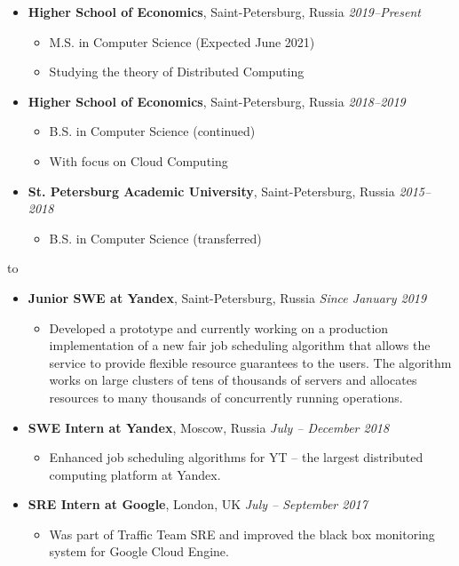 \documentclass[10pt,a4paper]{extarticle}
\def\tbf{\textbf}
\def\lrg#1{\large\textbf{#1}\normalsize}
\def\headline#1{\medskip\hbox to \hsize{\hrulefill\quad\lower.3em\hbox{\lrg{#1}}\quad\hrulefill}\medskip}
\def\reslist{\vspace{-8pt}\begin{itemize}[label={},leftmargin=*]}
\def\endreslist{\end{itemize}\vspace{-5pt}}
\def\resRaw#1{
  \item #1\normalsize
  \vspace{-5pt}
}
\def\resLocTime#1#2#3{
  \resRaw {
    \tbf{#1}, #2 \hspace*{\fill} \textit{#3}
  }
}
\def\beginres{\begin{itemize}[label=\textbullet]}
\def\endres{\end{itemize}\vspace{-6pt}}
\def\subitem{\item}
\begin{document}
\reslist
  \resLocTime{Higher School of Economics} {Saint-Petersburg, Russia} {2019--Present}
  \beginres
    \subitem M.S. in Computer Science (Expected June 2021)
    \subitem Studying the theory of Distributed Computing
  \endres
  \resLocTime{Higher School of Economics} {Saint-Petersburg, Russia} {2018--2019}
  \beginres
    \subitem B.S. in Computer Science (continued)
    \subitem With focus on Cloud Computing
  \endres
  \resLocTime{St. Petersburg Academic University} {Saint-Petersburg, Russia} {2015--2018}
  \beginres
    \subitem B.S. in Computer Science (transferred)
  \endres
\endreslist

\headline{Work Experience}

\reslist
  \resLocTime{Junior SWE at Yandex} {Saint-Petersburg, Russia} {Since January 2019}
  \beginres
    \subitem
      Developed a prototype and currently working on a production implementation of a new
      fair job scheduling algorithm that allows the service to provide flexible resource guarantees to the users.
      The algorithm works on large clusters of tens of thousands of servers and allocates resources to many
      thousands of concurrently running operations.
  \endres

  \resLocTime{SWE Intern at Yandex} {Moscow, Russia} {July -- December 2018}
  \beginres
    \subitem Enhanced job scheduling algorithms for YT -- the largest distributed computing platform at Yandex.
  \endres

  \resLocTime{SRE Intern at Google} {London, UK} {July -- September 2017}
  \beginres
    \subitem Was part of Traffic Team SRE and improved the black box monitoring system for Google Cloud Engine.
  \endres
\endreslist

%
\end{document}
